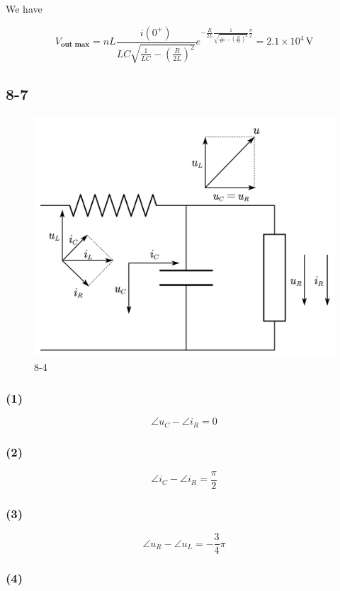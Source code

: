\documentclass[a4paper,11pt]{amsart}
\theoremstyle{definition}
\begin{document}
	We have 
	
	$$
	V_\textbf{out max}=nL\frac{i\left( 0^+ \right)}{LC\sqrt{\frac{1}{LC}-\left( \frac{R}{2L} \right) ^2}}e^{-\tfrac{R}{2L}\frac{1}{\sqrt{\frac{1}{LC}-\left( \frac{R}{2L} \right) ^2}}\tfrac{\pi}{2}}=2.1\times10^4\,\mathrm{V}
	$$
	
	\subsection*{8-7}
	
	\begin{figure}
		\centering
		\includegraphics[width=0.7\linewidth]{8-12}
		\caption*{8-4}
		\label{fig:8-12}
	\end{figure}
	
	\subsubsection*{(1)}
	
	$$
	\angle u_C-\angle i_R=0
	$$
	
	\subsubsection*{(2)}
	
	$$
	\angle i_C-\angle i_R=\frac{\pi}{2}
	$$
	
	\subsubsection*{(3)}
	
	$$
	\angle u_R-\angle u_L=-\frac{3}{4}\pi 
	$$
	
	\subsubsection*{(4)}
	
\end{document}
